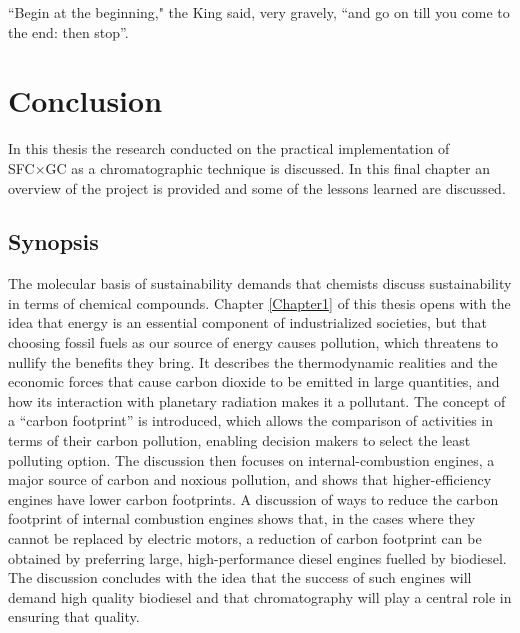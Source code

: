 
\begin{savequote}[\quotewidth]
``Begin at the beginning," the King said, very gravely, ``and go on till you come to the end: then stop''.
\end{savequote}

\chapter{Conclusion} %
\label{Chapter9}


In this thesis the research conducted on the practical implementation of SFC×GC
as a chromatographic technique is discussed. In this final chapter an overview
of the project is provided and some of the lessons learned are discussed.

\section{Synopsis}

The molecular basis of sustainability \autocite{Anastas2016} demands that
chemists discuss sustainability in terms of chemical compounds. Chapter
\ref{Chapter1} of this thesis opens with the idea that energy is an essential
component of industrialized societies, but that choosing fossil fuels as our
source of energy causes pollution, which threatens to nullify the benefits they
bring. It describes the thermodynamic realities and the economic forces that
cause carbon dioxide to be emitted in large quantities, and how its interaction
with planetary radiation makes it a pollutant. The concept of a ``carbon
footprint'' is introduced, which allows the comparison of activities in terms of
their carbon pollution, enabling decision makers to select the least polluting
option. The discussion then focuses on internal-combustion engines, a major
source of carbon and noxious pollution, and shows that higher-efficiency engines
have lower carbon footprints. A discussion of ways to reduce the carbon
footprint of internal combustion engines shows that, in the cases where they
cannot be replaced by electric motors, a reduction of carbon footprint can be
obtained by preferring large, high-performance diesel engines fuelled by
biodiesel. The discussion concludes with the idea that the success of such
engines will demand high quality biodiesel and that chromatography will play a
central role in ensuring that quality.

